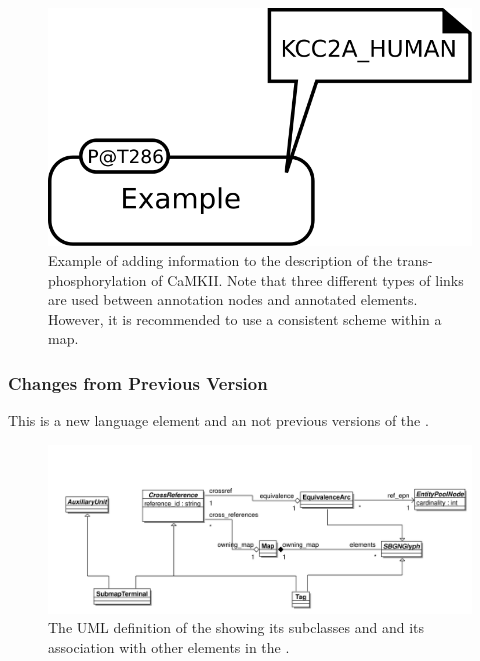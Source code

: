 \begin{figure}[htb]
  \centering
  \includegraphics[scale = 0.5]{examples/ex-annotation}
  \caption{Example of  adding information to the
    description of the trans-phosphorylation of CaMKII. Note that
    three different types of links are used between annotation nodes
    and annotated elements. However, it is recommended to use a
    consistent scheme within a map.}
  \label{fig:techref:ex-annotation}
\end{figure}

\subsubsection{Changes from Previous Version}

This is a new language element and an not previous versions of the \PDl.


\label{defn:CrossReference}

\begin{figure}[htb]
  \centering
  \includegraphics[width = \textwidth]{images/crossreferenceuml}
  \caption{The UML definition of the  showing
    its subclasses  and  and
    its association with other elements in the \PDl.}
  \label{fig:techref:crossreferenceuml}
\end{figure}


